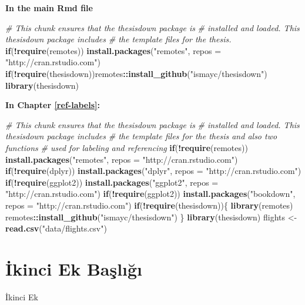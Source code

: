 \documentclass[12pt,twoside]{deuthesis}
\newenvironment{Shaded}{\begin{snugshade}}{\end{snugshade}}
\newcommand{\AttributeTok}[1]{\textcolor[rgb]{0.13,0.29,0.53}{#1}}
\newcommand{\CommentTok}[1]{\textcolor[rgb]{0.56,0.35,0.01}{\textit{#1}}}
\newcommand{\ControlFlowTok}[1]{\textcolor[rgb]{0.13,0.29,0.53}{\textbf{#1}}}
\newcommand{\FunctionTok}[1]{\textcolor[rgb]{0.13,0.29,0.53}{\textbf{#1}}}
\newcommand{\NormalTok}[1]{#1}
\newcommand{\OtherTok}[1]{\textcolor[rgb]{0.56,0.35,0.01}{#1}}
\newcommand{\SpecialCharTok}[1]{\textcolor[rgb]{0.81,0.36,0.00}{\textbf{#1}}}
\newcommand{\StringTok}[1]{\textcolor[rgb]{0.31,0.60,0.02}{#1}}
\begin{document}
\textbf{In the main Rmd file}
\begin{Shaded}
\begin{Highlighting}[]
\CommentTok{\# This chunk ensures that the thesisdown package is}
\CommentTok{\# installed and loaded. This thesisdown package includes}
\CommentTok{\# the template files for the thesis.}
 \ControlFlowTok{if}\NormalTok{(}\SpecialCharTok{!}\FunctionTok{require}\NormalTok{(remotes)) }\FunctionTok{install.packages}\NormalTok{(}\StringTok{"remotes"}\NormalTok{, }\AttributeTok{repos =} \StringTok{"http://cran.rstudio.com"}\NormalTok{)}
 \ControlFlowTok{if}\NormalTok{(}\SpecialCharTok{!}\FunctionTok{require}\NormalTok{(thesisdown))remotes}\SpecialCharTok{::}\FunctionTok{install\_github}\NormalTok{(}\StringTok{"ismayc/thesisdown"}\NormalTok{)}
 \FunctionTok{library}\NormalTok{(thesisdown)}
\end{Highlighting}
\end{Shaded}
\textbf{In Chapter \ref{ref-labels}:}
\begin{Shaded}
\begin{Highlighting}[]
\CommentTok{\# This chunk ensures that the thesisdown package is}
\CommentTok{\# installed and loaded. This thesisdown package includes}
\CommentTok{\# the template files for the thesis and also two functions}
\CommentTok{\# used for labeling and referencing}
\ControlFlowTok{if}\NormalTok{(}\SpecialCharTok{!}\FunctionTok{require}\NormalTok{(remotes))}
  \FunctionTok{install.packages}\NormalTok{(}\StringTok{"remotes"}\NormalTok{, }\AttributeTok{repos =} \StringTok{"http://cran.rstudio.com"}\NormalTok{)}
\ControlFlowTok{if}\NormalTok{(}\SpecialCharTok{!}\FunctionTok{require}\NormalTok{(dplyr))}
    \FunctionTok{install.packages}\NormalTok{(}\StringTok{"dplyr"}\NormalTok{, }\AttributeTok{repos =} \StringTok{"http://cran.rstudio.com"}\NormalTok{)}
\ControlFlowTok{if}\NormalTok{(}\SpecialCharTok{!}\FunctionTok{require}\NormalTok{(ggplot2))}
    \FunctionTok{install.packages}\NormalTok{(}\StringTok{"ggplot2"}\NormalTok{, }\AttributeTok{repos =} \StringTok{"http://cran.rstudio.com"}\NormalTok{)}
\ControlFlowTok{if}\NormalTok{(}\SpecialCharTok{!}\FunctionTok{require}\NormalTok{(ggplot2))}
    \FunctionTok{install.packages}\NormalTok{(}\StringTok{"bookdown"}\NormalTok{, }\AttributeTok{repos =} \StringTok{"http://cran.rstudio.com"}\NormalTok{)}
\ControlFlowTok{if}\NormalTok{(}\SpecialCharTok{!}\FunctionTok{require}\NormalTok{(thesisdown))\{}
  \FunctionTok{library}\NormalTok{(remotes)}
\NormalTok{  remotes}\SpecialCharTok{::}\FunctionTok{install\_github}\NormalTok{(}\StringTok{"ismayc/thesisdown"}\NormalTok{)}
\NormalTok{  \}}
\FunctionTok{library}\NormalTok{(thesisdown)}
\NormalTok{flights }\OtherTok{\textless{}{-}} \FunctionTok{read.csv}\NormalTok{(}\StringTok{"data/flights.csv"}\NormalTok{)}
\end{Highlighting}
\end{Shaded}
\hypertarget{ikinci-ek-baux15flux131ux11fux131}{%
\chapter{İkinci Ek Başlığı}\label{ikinci-ek-baux15flux131ux11fux131}}

İkinci Ek
\end{document}
